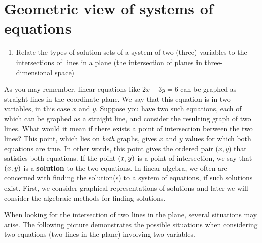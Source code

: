 \section{Geometric view of systems of equations}
\label{sec:systems-geometric}

\begin{outcome}
  \begin{enumerate}
  \item Relate the types of solution sets of a system of two (three)
    variables to the intersections of lines in a plane (the
    intersection of planes in three-dimensional space)
  \end{enumerate}
\end{outcome}

As you may remember, linear equations like $2x+3y=6$ can be graphed as
straight lines in the coordinate plane. We say that this equation is
in two variables, in this case $x$ and $y$.  Suppose you have two such
equations, each of which can be graphed as a straight line, and consider
the resulting graph of two lines. What would it mean if there exists a
point of intersection between the two lines? This point, which lies on
{\em both \em} graphs, gives $x$ and $y$ values for which both
equations are true. In other words, this point gives the ordered pair
($x,y$) that satisfies both equations.  If the point $\left(x, y
\right)$ is a point of intersection, we say that $\left(x, y \right)$
is a \textbf{solution} to the two equations. In linear algebra, we
often are concerned with finding the solution(s) to a system of
equations, if such solutions exist.  First, we consider graphical
representations of solutions and later we will consider the algebraic
methods for finding solutions.

When looking for the intersection of two lines in the plane, several situations may arise. The following picture demonstrates the possible situations
when considering two equations (two lines in the plane) involving two variables.



